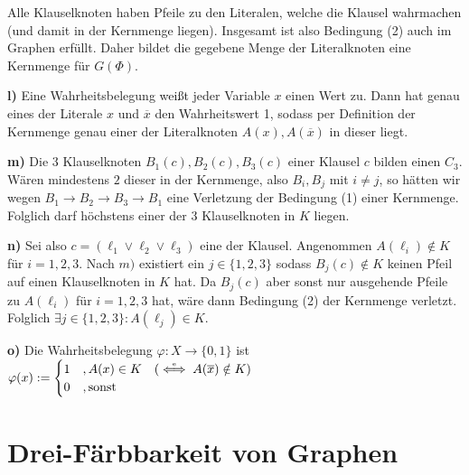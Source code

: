\documentclass[a4paper,graphics,11pt]{article}
\newcommand{\up}[2]{\mathrel{\overset{\makebox[0pt]{\mbox{\normalfont\tiny #2}}}{#1}}}
\begin{document}
Alle Klauselknoten haben Pfeile zu den Literalen, welche die Klausel wahrmachen (und damit in der Kernmenge liegen). Insgesamt ist also Bedingung (2) auch
im Graphen erfüllt. Daher bildet die gegebene Menge der Literalknoten eine Kernmenge für $G(\Phi)$.

\textbf{l)}
Eine Wahrheitsbelegung weißt jeder Variable $x$ einen Wert zu. Dann hat genau eines der Literale $x$ und $\overline{x}$
den Wahrheitswert 1, sodass per Definition der Kernmenge genau einer der Literalknoten $A(x), A(\overline{x})$ in dieser liegt.

\textbf{m)}
Die 3 Klauselknoten $B_1(c),B_2(c),B_3(c)$ einer Klausel $c$ bilden einen $C_3$. Wären mindestens $2$ dieser in der Kernmenge,
also $B_i, B_j$ mit $i \neq j$, so hätten wir wegen $B_1 \rightarrow B_2 \rightarrow B_3 \rightarrow B_1$ eine Verletzung
der Bedingung (1) einer Kernmenge. Folglich darf höchstens einer der 3 Klauselknoten in $K$ liegen.

\textbf{n)}
Sei also $c = (\ell_1 \lor \ell_2 \lor \ell_3)$ eine der Klausel. Angenommen $A(\ell_i) \notin K$ für $i=1,2,3$.
Nach $m)$ existiert ein $j \in \{1,2,3\}$ sodass $B_j(c) \notin K$ keinen Pfeil auf einen Klauselknoten in $K$ hat.
Da $B_j(c)$ aber sonst nur ausgehende Pfeile zu $A(\ell_i)$ für $i=1,2,3$ hat, wäre dann Bedingung (2) der Kernmenge
verletzt. Folglich $\exists j \in \{1,2,3\}: A(\ell_j) \in K$.

\textbf{o)}
Die Wahrheitsbelegung $\varphi: X \to \{0,1\}$ ist $\varphi(x) := \begin{cases}1 &, A(x) \in K\quad (\up{\iff}{e} A(\overline{x}) \notin K)\\ 0 &, \text{sonst}\\\end{cases}$
\newpage

\section{Drei-Färbbarkeit von Graphen}
\end{document}
